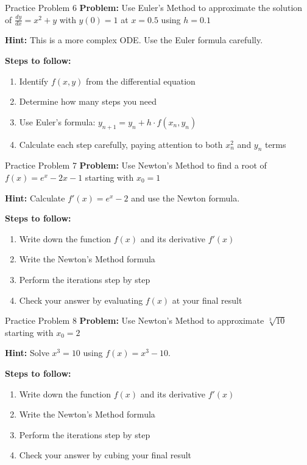 \documentclass[aspectratio=169]{beamer}
\begin{document}
\begin{frame}{Practice Problem 6}
\textbf{Problem:} Use Euler's Method to approximate the solution of $\frac{dy}{dx} = x^2 + y$ with $y(0) = 1$ at $x = 0.5$ using $h = 0.1$

\textbf{Hint:} This is a more complex ODE. Use the Euler formula carefully.

\vspace{1cm}
\textbf{Steps to follow:}
\begin{enumerate}
    \item Identify $f(x,y)$ from the differential equation
    \item Determine how many steps you need
    \item Use Euler's formula: $y_{n+1} = y_n + h \cdot f(x_n, y_n)$
    \item Calculate each step carefully, paying attention to both $x_n^2$ and $y_n$ terms
\end{enumerate}
\end{frame}

\begin{frame}{Practice Problem 7}
\textbf{Problem:} Use Newton's Method to find a root of $f(x) = e^x - 2x - 1$ starting with $x_0 = 1$

\textbf{Hint:} Calculate $f'(x) = e^x - 2$ and use the Newton formula.

\vspace{1cm}
\textbf{Steps to follow:}
\begin{enumerate}
    \item Write down the function $f(x)$ and its derivative $f'(x)$
    \item Write the Newton's Method formula
    \item Perform the iterations step by step
    \item Check your answer by evaluating $f(x)$ at your final result
\end{enumerate}
\end{frame}

\begin{frame}{Practice Problem 8}
\textbf{Problem:} Use Newton's Method to approximate $\sqrt[3]{10}$ starting with $x_0 = 2$

\textbf{Hint:} Solve $x^3 = 10$ using $f(x) = x^3 - 10$.

\vspace{1cm}
\textbf{Steps to follow:}
\begin{enumerate}
    \item Write down the function $f(x)$ and its derivative $f'(x)$
    \item Write the Newton's Method formula
    \item Perform the iterations step by step
    \item Check your answer by cubing your final result
\end{enumerate}
\end{frame}
\end{document}
